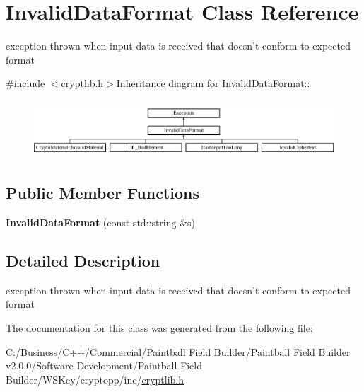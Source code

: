 \hypertarget{class_invalid_data_format}{
\section{InvalidDataFormat Class Reference}
\label{class_invalid_data_format}
}


exception thrown when input data is received that doesn't conform to expected format  


{\ttfamily \#include $<$cryptlib.h$>$}Inheritance diagram for InvalidDataFormat::\begin{figure}[H]
\begin{center}
\leavevmode
\includegraphics[height=2.17617cm]{class_invalid_data_format}
\end{center}
\end{figure}
\subsection*{Public Member Functions}
\begin{DoxyCompactItemize}
\item 
\hypertarget{class_invalid_data_format_a698d4d179bc8ffa1d16356fa4b3fa413}{
{\bfseries InvalidDataFormat} (const std::string \&s)}
\label{class_invalid_data_format_a698d4d179bc8ffa1d16356fa4b3fa413}

\end{DoxyCompactItemize}


\subsection{Detailed Description}
exception thrown when input data is received that doesn't conform to expected format 

The documentation for this class was generated from the following file:\begin{DoxyCompactItemize}
\item 
C:/Business/C++/Commercial/Paintball Field Builder/Paintball Field Builder v2.0.0/Software Development/Paintball Field Builder/WSKey/cryptopp/inc/\hyperlink{cryptlib_8h}{cryptlib.h}\end{DoxyCompactItemize}
